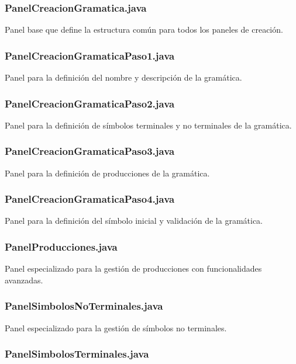 \subsubsection{PanelCreacionGramatica.java}

Panel base que define la estructura común para todos los paneles de creación.

\subsubsection{PanelCreacionGramaticaPaso1.java}

Panel para la definición del nombre y descripción de la gramática.

\subsubsection{PanelCreacionGramaticaPaso2.java}

Panel para la definición de símbolos terminales y no terminales de la gramática.

\subsubsection{PanelCreacionGramaticaPaso3.java}

Panel para la definición de producciones de la gramática.

\subsubsection{PanelCreacionGramaticaPaso4.java}

Panel para la definición del símbolo inicial y validación de la gramática.

\subsubsection{PanelProducciones.java}

Panel especializado para la gestión de producciones con funcionalidades avanzadas.

\subsubsection{PanelSimbolosNoTerminales.java}

Panel especializado para la gestión de símbolos no terminales.

\subsubsection{PanelSimbolosTerminales.java}

